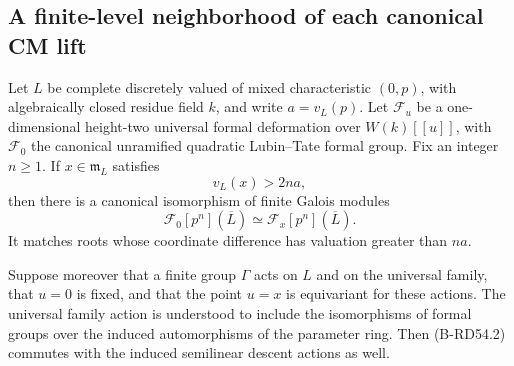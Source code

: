 \subsection{A finite-level neighborhood of each canonical CM lift}

\begin{lemma}
\label{lem:B-RD54-continuity}
Let $L$ be complete discretely valued of mixed characteristic $(0,p)$,
with algebraically closed residue field $k$, and write $a=v_L(p)$.
Let $\mathcal F_u$ be a one-dimensional height-two universal formal
deformation over $W(k)[[u]]$, with $\mathcal F_0$ the canonical
unramified quadratic Lubin--Tate formal group. Fix an integer $n\ge1$.
If $x\in\mathfrak m_L$ satisfies
\[
                          v_L(x)>2na,                 \tag{B-RD54.1}
\]
then there is a canonical isomorphism of finite Galois modules
\[
               \mathcal F_0[p^n](\overline L)
                   \simeq\mathcal F_x[p^n](\overline L).
                                                        \tag{B-RD54.2}
\]
It matches roots whose coordinate difference has valuation greater
than $na$.

Suppose moreover that a finite group $\Gamma$ acts on $L$ and on
the universal family, that $u=0$ is fixed, and that the point $u=x$
is equivariant for these actions. The universal family action is
understood to include the isomorphisms of formal groups over the
induced automorphisms of the parameter ring. Then (B-RD54.2)
commutes with the induced semilinear descent actions as well.
\end{lemma}
